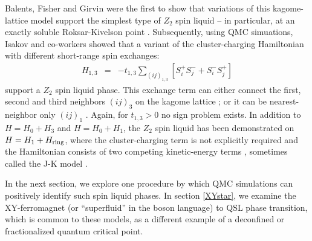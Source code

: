 \documentclass[range]{ar2e}
\begin{document}
Balents, Fisher and Girvin \cite{BFG} were the first to show that variations of this kagome-lattice model support the simplest type of $Z_2$ spin liquid -- in particular, at an exactly soluble Roksar-Kivelson point \cite{Rokhsar88}.  Subsequently, using QMC simuations, Isakov and co-workers showed that a variant of the cluster-charging Hamiltonian with different short-range spin exchanges: 
\begin{eqnarray}
H_{1,3} &=& -t_{1,3} \sum_{( ij )_{1,3}} [S^{+}_i S^-_j + S^-_i S^{+}_j]  
\end{eqnarray}
support a $Z_2$ spin liquid phase.  This exchange term can either connect the first, second and third neighbors $( ij )_3$ on the kagome lattice \cite{Isakov1,Isakov2}; or it can be nearest-neighbor only $( ij )_1$ \cite{TopoEE}.  Again, for $t_{1,3}>0$ no sign problem exists. 
In addition to  $H = H_0 + H_3$ and $H = H_0 + H_1$, the $Z_2$ spin liquid has been demonstrated on $H = H_1 + H_{\rm ring}$, where the cluster-charging term is not explicitly required and the Hamiltonian consists of two competing kinetic-energy terms \cite{Long}, sometimes called the J-K model \cite{JKqmc}.



In the next section, we explore one procedure by which QMC simulations can positively identify such spin liquid phases.  In section \ref{XYstar}, we examine the XY-ferromagnet (or ``superfluid'' in the boson language) to QSL phase transition, which is common to these models, as a different example of a deconfined or fractionalized quantum critical point.
\end{document}
